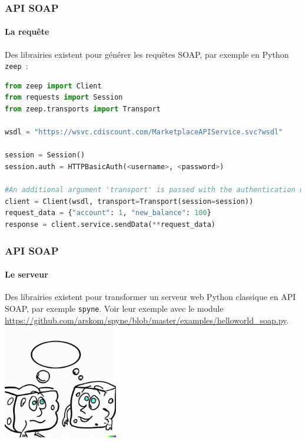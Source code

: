 \documentclass{beamer}
\begin{document}
    \begin{frame}[fragile]
        \transdissolve
        \frametitle{API SOAP}
        \framesubtitle{La requête}
        Des librairies existent pour générer les requêtes SOAP, par exemple en Python \lstinline{zeep}~:
        \begin{lstlisting}[language=python,basicstyle=\ttfamily\tiny]
from zeep import Client
from requests import Session
from zeep.transports import Transport

wsdl = "https://wsvc.cdiscount.com/MarketplaceAPIService.svc?wsdl"

session = Session()
session.auth = HTTPBasicAuth(<username>, <password>)

#An additional argument 'transport' is passed with the authentication details
client = Client(wsdl, transport=Transport(session=session))
request_data = {"account": 1, "new_balance": 100}
response = client.service.sendData(**request_data)
        \end{lstlisting}
    \end{frame}

    \begin{frame}
        \transdissolve
        \frametitle{API SOAP}
        \framesubtitle{Le serveur}
        Des librairies existent pour transformer un serveur web Python classique en API SOAP, par exemple \lstinline{spyne}.
        Voir leur exemple avec le module \url{https://github.com/arskom/spyne/blob/master/examples/helloworld_soap.py}.
        \bigbreak
        \centering
        \includegraphics[width=5cm]{image/soaps-chatting}
    \end{frame}
\end{document}
